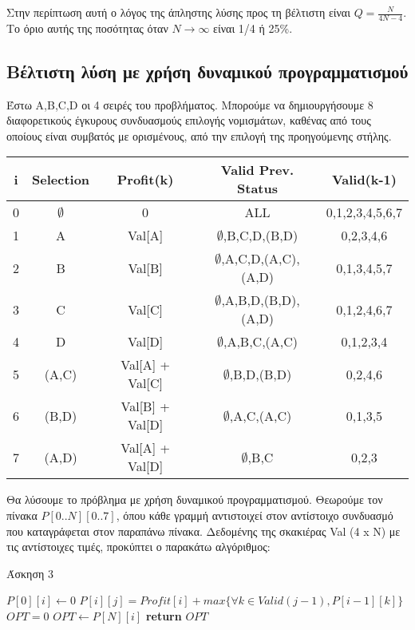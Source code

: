 \documentclass[a4paper,11pt]{article}
\begin{document}
Στην περίπτωση αυτή ο λόγος της άπληστης λύσης προς τη βέλτιστη είναι
$Q = \frac{N}{4N-4}$. Tο όριο αυτής της ποσότητας όταν $N \to\infty$ είναι 1/4 ή
25\%.

\subsection{Βέλτιστη λύση με χρήση δυναμικού προγραμματισμού}
Έστω A,B,C,D οι 4 σειρές του προβλήματος. Μπορούμε να δημιουργήσουμε 8
διαφορετικούς έγκυρους συνδυασμούς επιλογής νομισμάτων, καθένας από τους
οποίους είναι συμβατός με ορισμένους, από την επιλογή της προηγούμενης στήλης.
\begin{center}
    \begin{tabular}{ | c | c | c | c | c |}
    \hline
    i & Selection & Profit(k) & Valid Prev. Status & Valid(k-1) \\ \hline \hline
    0 & $\emptyset$ & 0 & ALL & {0,1,2,3,4,5,6,7}\\ \hline
    1 & A & Val[A] & $\emptyset$,B,C,D,(B,D) & {0,2,3,4,6}\\ \hline
    2 & B & Val[B] & $\emptyset$,A,C,D,(A,C),(A,D) & {0,1,3,4,5,7}\\ \hline
    3 & C & Val[C] & $\emptyset$,A,B,D,(B,D),(A,D) & {0,1,2,4,6,7}\\ \hline
    4 & D & Val[D] & $\emptyset$,A,B,C,(A,C) & {0,1,2,3,4}\\ \hline
    5 & (A,C) & Val[A] + Val[C] & $\emptyset$,B,D,(B,D) & {0,2,4,6}\\ \hline
    6 & (B,D) & Val[B] + Val[D] & $\emptyset$,A,C,(A,C) & {0,1,3,5}\\ \hline
    7 & (A,D) & Val[A] + Val[D] & $\emptyset$,B,C & {0,2,3}\\
    \hline
    \end{tabular}
\end{center}

Θα λύσουμε το πρόβλημα με χρήση δυναμικού προγραμματισμού.
Θεωρούμε τον πίνακα $P[0..N][0..7]$, όπου κάθε γραμμή αντιστοιχεί στον αντίστοιχο
συνδυασμό που καταγράφεται στον παραπάνω πίνακα. Δεδομένης της σκακιέρας
Val (4 x N) με τις αντίστοιχες τιμές, προκύπτει ο παρακάτω αλγόριθμος:

\begin{algorithm}[H]
\caption{Άσκηση 3}
\begin{algorithmic}[1]
	\State $P[0][i] \gets 0$
    \EndFor
	    \State $P[i][j] = Profit[i] + max\{ \forall k \in Valid(j-1),P[i-1][k]\}$
	\EndFor
    \EndFor
    \State $OPT = 0$
	    \State $OPT \gets P[N][i]$
	\EndIf
    \EndFor
    \State \textbf{return} $OPT$
\EndProcedure
\end{algorithmic}
\end{algorithm}
\end{document}
